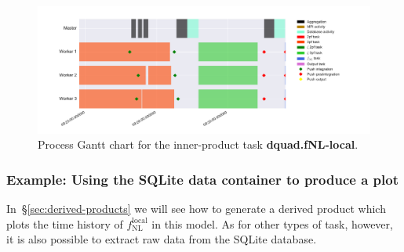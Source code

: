 \documentclass[11pt,a4paper]{article}
\newcommand{\fNL}{f_{\mathrm{NL}}}
\newcommand{\fNLlocal}{\fNL^{\text{local}}}
\newcommand{\repoobject}[1]{{\ttfamily\bfseries\small #1}}
\newcommand{\packagefont}{\sffamily}
\newcommand{\SQLite}{{\packagefont SQLite}}
\begin{document}
\begin{figure}
    \begin{center}
        \includegraphics[scale=0.5]{Outputs/gantt-fNL}    
    \end{center}
    \caption{\label{fig:gantt-fNL}Process Gantt chart for the inner-product task \repoobject{dquad.fNL-local}.}
\end{figure}

\subsubsection{Example: Using the {\SQLite} data container to produce a plot}
In~\S\ref{sec:derived-products}
we will see how to generate a derived product
which plots the time history of
$\fNLlocal$ in this model.
As for other types of task, however, it is also possible to extract
raw data from the {\SQLite} database.
\end{document}
